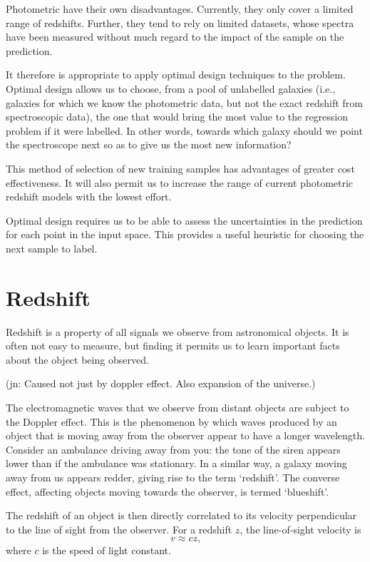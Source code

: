 \documentclass[11pt,twoside,openright]{report}
\newcommand\jn[1]{{\color{red}(jn: #1)}}
\begin{document}
Photometric have their own disadvantages. Currently, they only cover a limited range of redshifts. Further, they tend to rely on limited datasets, whose spectra have been measured without much regard to the impact of the sample on the prediction.

It therefore is appropriate to apply optimal design techniques to the problem. Optimal design allows us to choose, from a pool of unlabelled galaxies (i.e., galaxies for which we know the photometric data, but not the exact redshift from spectroscopic data), the one that would bring the most value to the regression problem if it were labelled. In other words, towards which galaxy should we point the spectroscope next so as to give us the most new information?

This method of selection of new training samples has advantages of greater cost effectiveness. It will also permit us to increase the range of current photometric redshift models with the lowest effort.

Optimal design requires us to be able to assess the uncertainties in the prediction for each point in the input space. This provides a useful heuristic for choosing the next sample to label.

\section{Redshift}
  Redshift is a property of all signals we observe from astronomical objects. It is often not easy to measure, but finding it permits us to learn important facts about the object being observed.

  \jn{Caused not just by doppler effect. Also expansion of the universe.}

  The electromagnetic waves that we observe from distant objects are subject to the Doppler effect. This is the phenomenon by which waves produced by an object that is moving away from the observer appear to have a longer wavelength. Consider an ambulance driving away from you: the tone of the siren appears lower than if the ambulance was stationary. In a similar way, a galaxy moving away from us appears redder, giving rise to the term `redshift'. The converse effect, affecting objects moving towards the observer, is termed `blueshift'.

  The redshift of an object is then directly correlated to its velocity perpendicular to the line of sight from the observer. For a redshift $z$, the line-of-sight velocity is\[
      v \approx cz \text{,}
  \] where $c$ is the speed of light constant.
\end{document}
